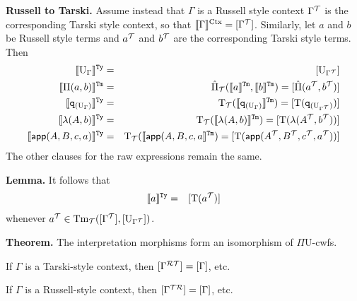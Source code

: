 \documentclass{lmcs}
\def\UU{\mathrm{U}}
\def\Ta{\mathrm{T}}
\newcommand{\intTyU}[1]{\llbracket #1 \rrbracket^\RawTy}
\newcommand{\intTmU}[1]{\llbracket #1 \rrbracket^\RawTm}
\begin{document}
{\bf Russell to Tarski.} 
Assume instead that $\Gamma$ is a Russell style context $\Gamma^{\mathcal T}$ is the corresponding Tarski style context, so that $\llbracket \Gamma \rrbracket^{\mathrm{Ctx}} = [ \Gamma^{\mathcal T} ]$. Similarly, let $a$ and $b$ be Russell style terms and $a^{\mathcal T}$ and $b^{\mathcal T}$ are the corresponding Tarski style terms. Then
\begin{eqnarray*}
\intTyU{\UU_\Gamma} &=& [ \UU_{\Gamma^\T} ]\\
\intTmU{\Pi(a,b)}&=& \hat{\Pi}_\T(\intTmU{a},\intTmU{b}) = [ \hat{\Pi}(a^\T,b^\T) ]\\
\intTyU{\qI_{(\UU_\Gamma)}}&=& \Ta_\T(\intTmU{\qI_{(\UU_\Gamma)}}) = [ \Ta(\qI_{(\UU_{\Gamma^\T})}) ]\\
\intTyU{\lambda(A,b)}&=& \Ta_\T(\intTmU{\lambda(A,b)}) = [ \Ta(\lambda(A^\T ,b^\T )) ]\\
\intTyU{\app(A,B,c,a)}&=& \Ta_\T(\intTmU{\app(A,B,c,a}) = [ \Ta(\app(A^\T ,B^\T ,c^\T ,a^\T )) ]
\end{eqnarray*}
The other clauses for the raw expressions remain the same.

{\bf Lemma.}
It follows that
\begin{eqnarray*}
\intTyU{a} &=& [ \Ta(a^\T) ]
\end{eqnarray*}
whenever $a^\T \in  \Tm_\T([\Gamma^\T],[\UU_{\Gamma^\T}])$. 

{\bf Theorem.} The interpretation morphisms form an isomorphism of $\Pi\UU$-cwfs. 

If $\Gamma$ is a Tarski-style context, then $[ \Gamma^{\mathcal{R}{\mathcal T}} ] = [ \Gamma ]$, etc. 

If $\Gamma$ is a Russell-style context, then $[ \Gamma^{{\mathcal T}\mathcal{R}} ] = [ \Gamma ]$, etc.




\end{document}
